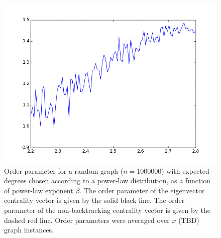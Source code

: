 \documentclass[twocolumn,prl,superscriptaddress]{revtex4}
\begin{document}
\begin{figure}
\begin{center}
\includegraphics[width=\columnwidth]{power_plot.png}
\end{center}
\caption{Order parameter for a random graph ($n=1000000$) with expected degrees chosen according to a power-law distribution, as a function of power-law exponent $\beta$. The order parameter of the eigenvector centrality vector is given by the solid black line. The order parameter of the non-backtracking centrality vector is given by the dashed red line. Order parameters were averaged over $x$ (TBD) graph instances.}
\label{fig:power-law}
\end{figure}
\end{document}
